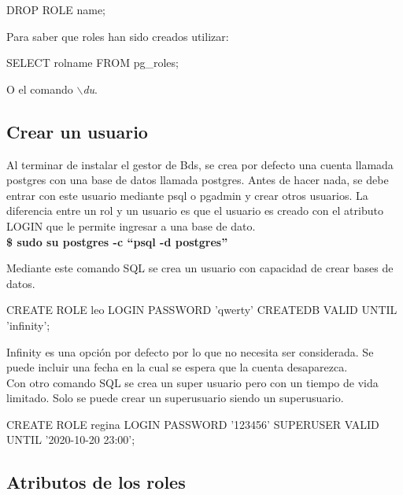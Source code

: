 \begin{pyglist}
DROP ROLE name;
\end{pyglist}

Para saber que roles han sido creados utilizar:\\

\begin{pyglist}
SELECT rolname FROM pg_roles;
\end{pyglist}

O el comando \textit{{$\backslash$}du}.

\subsection{Crear un usuario}

Al terminar de instalar el gestor de Bds, se crea por defecto una cuenta llamada postgres con una base de datos llamada postgres. Antes de hacer nada, se debe entrar con este usuario mediante psql o pgadmin y crear otros usuarios. La diferencia entre un rol y un usuario es que el usuario es creado con el atributo LOGIN que le permite ingresar a una base de dato. \\

\textbf{\$  sudo su postgres -c ``psql -d postgres''}

Mediante este comando SQL se crea un usuario con capacidad de crear bases de datos.\\

\begin{pyglist}
CREATE ROLE leo LOGIN PASSWORD 'qwerty' CREATEDB VALID UNTIL 'infinity';
\end{pyglist}

Infinity es una opción por defecto por lo que no necesita ser considerada. Se puede incluir una fecha  en la cual se espera que la cuenta desaparezca.\\

Con otro comando SQL se crea un super usuario pero con un tiempo de vida limitado. Solo se puede crear un superusuario siendo un superusuario.\\

\begin{pyglist}
CREATE ROLE regina LOGIN PASSWORD '123456' SUPERUSER VALID UNTIL '2020-10-20 23:00';
\end{pyglist}

\subsection{Atributos de los roles}

